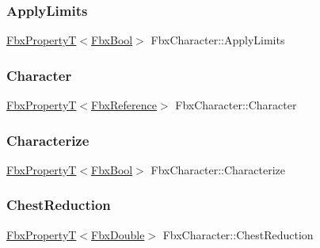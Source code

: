\mbox{\label{class_fbx_character_ac65d1b275b0ad4ff6f53750d87c5fb97}} 
\subsubsection{\texorpdfstring{Apply\+Limits}{ApplyLimits}}
{\footnotesize\ttfamily \hyperlink{class_fbx_property_t}{Fbx\+PropertyT}$<$\hyperlink{fbxtypes_8h_a92e0562b2fe33e76a242f498b362262e}{Fbx\+Bool}$>$ Fbx\+Character\+::\+Apply\+Limits}

\mbox{\label{class_fbx_character_a983a4ad7a5845c73bfca3e5c3ba7c627}} 
\subsubsection{\texorpdfstring{Character}{Character}}
{\footnotesize\ttfamily \hyperlink{class_fbx_property_t}{Fbx\+PropertyT}$<$\hyperlink{fbxtypes_8h_a44df6a2eec915cf27cd481e5c5e48a24}{Fbx\+Reference}$>$ Fbx\+Character\+::\+Character}

\mbox{\label{class_fbx_character_aba95c8944cb952c7e5dd0e3ceaba2bb3}} 
\subsubsection{\texorpdfstring{Characterize}{Characterize}}
{\footnotesize\ttfamily \hyperlink{class_fbx_property_t}{Fbx\+PropertyT}$<$\hyperlink{fbxtypes_8h_a92e0562b2fe33e76a242f498b362262e}{Fbx\+Bool}$>$ Fbx\+Character\+::\+Characterize}

\mbox{\label{class_fbx_character_af9b963a8d92ba9c5e7a67ff3afdcf7df}} 
\subsubsection{\texorpdfstring{Chest\+Reduction}{ChestReduction}}
{\footnotesize\ttfamily \hyperlink{class_fbx_property_t}{Fbx\+PropertyT}$<$\hyperlink{fbxtypes_8h_a171e72a1c46fc15c1a6c9c31948c1c5b}{Fbx\+Double}$>$ Fbx\+Character\+::\+Chest\+Reduction}

